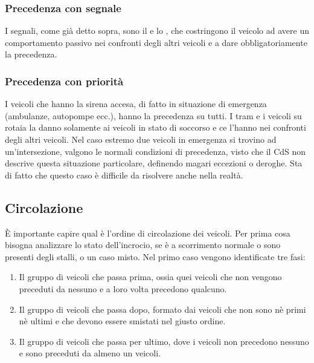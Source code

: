\subsubsection{Precedenza con segnale}
I segnali, come già detto sopra, sono il  e lo , che costringono il veicolo ad avere un comportamento passivo nei confronti degli altri veicoli e a dare obbligatoriamente la precedenza.

\subsubsection{Precedenza con priorità}
I veicoli che hanno la sirena accesa, di fatto in situazione di emergenza (ambulanze, autopompe ecc.), hanno la precedenza su tutti. I tram e i veicoli su rotaia la danno solamente ai veicoli in stato di soccorso e ce l'hanno nei confronti degli altri veicoli. Nel caso estremo due veicoli in emergenza si trovino ad un'intersezione, valgono le normali condizioni di precedenza, visto che il CdS non descrive questa situazione particolare, definendo magari eccezioni o deroghe. Sta di fatto che questo caso è difficile da risolvere anche nella realtà.

\subsection{Circolazione}
È importante capire qual è l'ordine di circolazione dei veicoli. Per prima cosa bisogna analizzare lo stato dell'incrocio, se è a scorrimento normale o sono presenti degli stalli, o un caso misto. Nel primo caso vengono identificate tre fasi:
\begin{enumerate}
	\item Il gruppo di veicoli che passa prima, ossia quei veicoli che non vengono preceduti da nessuno e a loro volta precedono qualcuno.
	\item Il gruppo di veicoli che passa dopo, formato dai veicoli che non sono nè primi nè ultimi e che devono essere smistati nel giusto ordine.
	\item Il gruppo di veicoli che passa per ultimo, dove i veicoli non precedono nessuno e sono preceduti da almeno un veicoli.
\end{enumerate}

